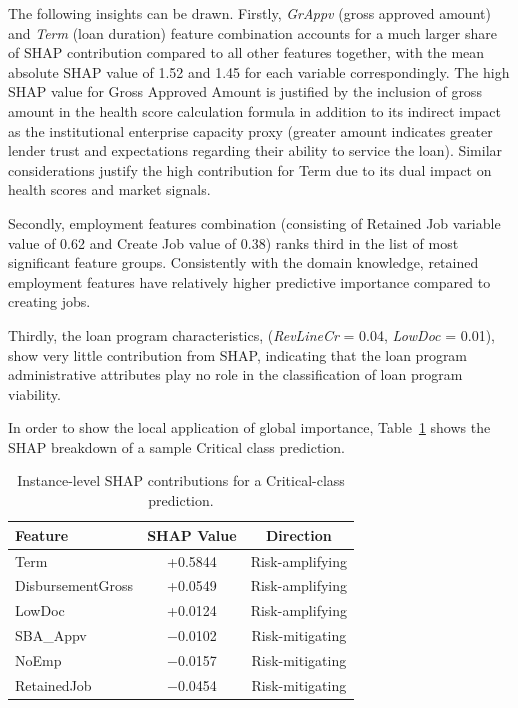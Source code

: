The following insights can be drawn. Firstly, \textit{GrAppv} (gross approved amount) and \textit{Term} (loan duration) feature combination accounts for a much larger share of SHAP contribution compared to all other features together, with the mean absolute SHAP value of 1.52 and 1.45 for each variable correspondingly. The high SHAP value for Gross Approved Amount is justified by the inclusion of gross amount in the health score calculation formula in addition to its indirect impact as the institutional enterprise capacity proxy (greater amount indicates greater lender trust and expectations regarding their ability to service the loan). Similar considerations justify the high contribution for Term due to its dual impact on health scores and market signals.

Secondly, employment features combination (consisting of Retained Job variable value of 0.62 and Create Job value of 0.38) ranks third in the list of most significant feature groups. Consistently with the domain knowledge, retained employment features have relatively higher predictive importance compared to creating jobs.

Thirdly, the loan program characteristics, (\textit{RevLineCr} = 0.04, \textit{LowDoc} = 0.01), show very little contribution from SHAP, indicating that the loan program administrative attributes play no role in the classification of loan program viability.

In order to show the local application of global importance, Table~\ref{tab:shap_instance} shows the SHAP breakdown of a sample Critical class prediction.

\begin{table}[htbp]
\centering
\caption{Instance-level SHAP contributions for a Critical-class prediction.}
\label{tab:shap_instance}
\begin{tabular}{lcc}
\hline
\textbf{Feature} & \textbf{SHAP Value} & \textbf{Direction} \\
\hline
Term & +0.5844 & Risk-amplifying \\
DisbursementGross & +0.0549 & Risk-amplifying \\
LowDoc & +0.0124 & Risk-amplifying \\
SBA\_Appv & $-$0.0102 & Risk-mitigating \\
NoEmp & $-$0.0157 & Risk-mitigating \\
RetainedJob & $-$0.0454 & Risk-mitigating \\
\hline
\end{tabular}
\end{table}

